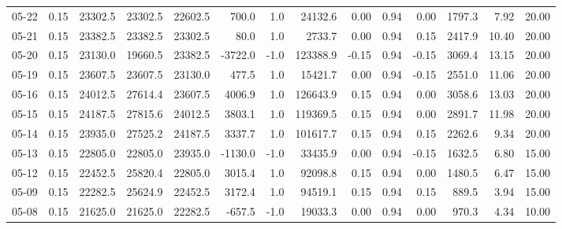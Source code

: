 \begin{threeparttable}
{\begin{tabular}{lrrrrrrrrrrrrr}
  05-22 &     0.15 & 23302.5 & 23302.5 & 22602.5 &      700.0 &                      1.0 &             24132.6 &       0.00 &      0.94 &           0.00 &           1797.3 &            7.92 &                  20.00 \\
  05-21 &     0.15 & 23382.5 & 23382.5 & 23302.5 &       80.0 &                      1.0 &              2733.7 &       0.00 &      0.94 &           0.15 &           2417.9 &           10.40 &                  20.00 \\
  05-20 &     0.15 & 23130.0 & 19660.5 & 23382.5 &    -3722.0 &                     -1.0 &            123388.9 &      -0.15 &      0.94 &          -0.15 &           3069.4 &           13.15 &                  20.00 \\
  05-19 &     0.15 & 23607.5 & 23607.5 & 23130.0 &      477.5 &                      1.0 &             15421.7 &       0.00 &      0.94 &          -0.15 &           2551.0 &           11.06 &                  20.00 \\
  05-16 &     0.15 & 24012.5 & 27614.4 & 23607.5 &     4006.9 &                      1.0 &            126643.9 &       0.15 &      0.94 &           0.00 &           3058.6 &           13.03 &                  20.00 \\
  05-15 &     0.15 & 24187.5 & 27815.6 & 24012.5 &     3803.1 &                      1.0 &            119369.5 &       0.15 &      0.94 &           0.00 &           2891.7 &           11.98 &                  20.00 \\
  05-14 &     0.15 & 23935.0 & 27525.2 & 24187.5 &     3337.7 &                      1.0 &            101617.7 &       0.15 &      0.94 &           0.15 &           2262.6 &            9.34 &                  20.00 \\
  05-13 &     0.15 & 22805.0 & 22805.0 & 23935.0 &    -1130.0 &                     -1.0 &             33435.9 &       0.00 &      0.94 &          -0.15 &           1632.5 &            6.80 &                  15.00 \\
  05-12 &     0.15 & 22452.5 & 25820.4 & 22805.0 &     3015.4 &                      1.0 &             92098.8 &       0.15 &      0.94 &           0.00 &           1480.5 &            6.47 &                  15.00 \\
  05-09 &     0.15 & 22282.5 & 25624.9 & 22452.5 &     3172.4 &                      1.0 &             94519.1 &       0.15 &      0.94 &           0.15 &            889.5 &            3.94 &                  15.00 \\
  05-08 &     0.15 & 21625.0 & 21625.0 & 22282.5 &     -657.5 &                     -1.0 &             19033.3 &       0.00 &      0.94 &           0.00 &            970.3 &            4.34 &                  10.00 \\

\end{tabular}}
\end{threeparttable}
